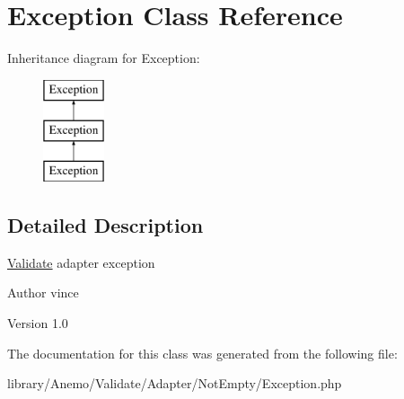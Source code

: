 \hypertarget{class_anemo_1_1_validate_1_1_adapter_1_1_not_empty_1_1_exception}{
\section{Exception Class Reference}
\label{class_anemo_1_1_validate_1_1_adapter_1_1_not_empty_1_1_exception}
}
Inheritance diagram for Exception:\begin{figure}[H]
\begin{center}
\leavevmode
\includegraphics[height=3.000000cm]{class_anemo_1_1_validate_1_1_adapter_1_1_not_empty_1_1_exception}
\end{center}
\end{figure}


\subsection{Detailed Description}
\hyperlink{class_anemo_1_1_validate}{Validate} adapter exception \begin{DoxyAuthor}{Author}
vince 
\end{DoxyAuthor}
\begin{DoxyVersion}{Version}
1.0 
\end{DoxyVersion}


The documentation for this class was generated from the following file:\begin{DoxyCompactItemize}
\item 
library/Anemo/Validate/Adapter/NotEmpty/Exception.php\end{DoxyCompactItemize}
